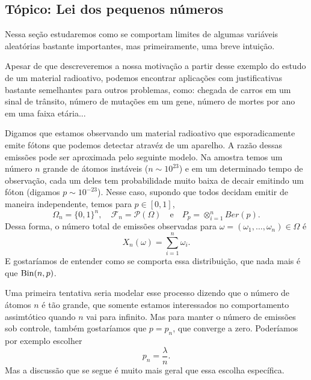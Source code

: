 \begin{topics}

\section{Tópico: Lei dos pequenos números}

Nessa seção estudaremos como se comportam limites de algumas variáveis aleatórias bastante importantes, mas primeiramente, uma breve intuição.

Apesar de que descreveremos a nossa motivação a partir desse exemplo do estudo de um material radioativo, podemos encontrar aplicações com justificativas bastante semelhantes para outros problemas, como: chegada de carros em um sinal de trânsito, número de mutações em um gene, número de mortes por ano em uma faixa etária...

Digamos que estamos observando um material radioativo que esporadicamente emite fótons que podemos detectar atravéz de um aparelho.
A razão dessas emissões pode ser aproximada pelo seguinte modelo.
Na amostra temos um número $n$ grande de átomos instáveis ($n \sim 10^{23}$) e em um determinado tempo de observação, cada um deles tem probabilidade muito baixa de decair emitindo um fóton (digamos $p \sim 10^{-23}$).
Nesse caso, supondo que todos decidam emitir de maneira independente, temos para $p \in [0,1]$,
\begin{equation}
  \label{e:Poisson_setup}
  \Omega_n = \{0,1\}^n, \quad \mathcal{F}_n = \mathcal{P}(\Omega) \quad \text{e} \quad P_p = \otimes_{i=1}^n Ber(p).
\end{equation}
Dessa forma, o número total de emissões observadas para $\omega = (\omega_1, \dots, \omega_n) \in \Omega$ é
\begin{equation}
  \label{e:Xn_Poisson}
  X_n(\omega) = \sum_{i=1}^n \omega_i.
\end{equation}
E gostaríamos de entender como se comporta essa distribuição, que nada mais é que $\operatorname{Bin}(n,p)$.

Uma primeira tentativa seria modelar esse processo dizendo que o número de átomos $n$ é tão grande, que somente estamos interessados no comportamento assimtótico quando $n$ vai para infinito.
Mas para manter o número de emissões sob controle, também gostaríamos que $p = p_n$, que converge a zero.
Poderíamos por exemplo escolher
\begin{equation}
  p_n = \frac \lambda n.
\end{equation}
Mas a discussão que se segue é muito mais geral que essa escolha específica.


\end{topics}
